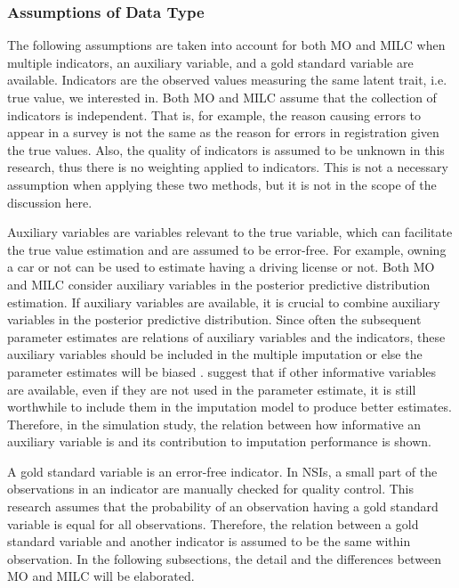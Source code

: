 \documentclass[oneside,a4paper]{article}
\begin{document}
\subsubsection*{Assumptions of Data Type}
The following assumptions are taken into account for both MO and MILC when multiple indicators, an auxiliary variable, and a gold standard variable are available. Indicators are the observed values measuring the same latent trait, i.e. true value, we interested in. Both MO and MILC assume that the collection of indicators is independent. That is, for example, the reason causing errors to appear in a survey is not the same as the reason for errors in registration given the true values. Also, the quality of indicators is assumed to be unknown in this research, thus there is no weighting applied to indicators. This is not a necessary assumption when applying these two methods, but it is not in the scope of the discussion here.

Auxiliary variables are variables relevant to the true variable, which can facilitate the true value estimation and are assumed to be error-free. For example, owning a car or not can be used to estimate having a driving license or not. Both MO and MILC consider auxiliary variables in the posterior predictive distribution estimation. If auxiliary variables are available, it is crucial to combine auxiliary variables in the posterior predictive distribution. Since often the subsequent parameter estimates are relations of auxiliary variables and the indicators, these auxiliary variables should be included in the multiple imputation or else the parameter estimates will be biased \cite{meng}.  suggest that if other informative variables are available, even if they are not used in the parameter estimate, it is still worthwhile to include them in the imputation model to produce better estimates. Therefore, in the simulation study, the relation between how informative an auxiliary variable is and its contribution to imputation performance is shown. 

A gold standard variable is an error-free indicator. In NSIs, a small part of the observations in an indicator are manually checked for quality control. This research assumes that the probability of an observation having a gold standard variable is equal for all observations. Therefore, the relation between a gold standard variable and another indicator is assumed to be the same within observation. In the following subsections, the detail and the differences between MO and MILC will be elaborated.
\end{document}
